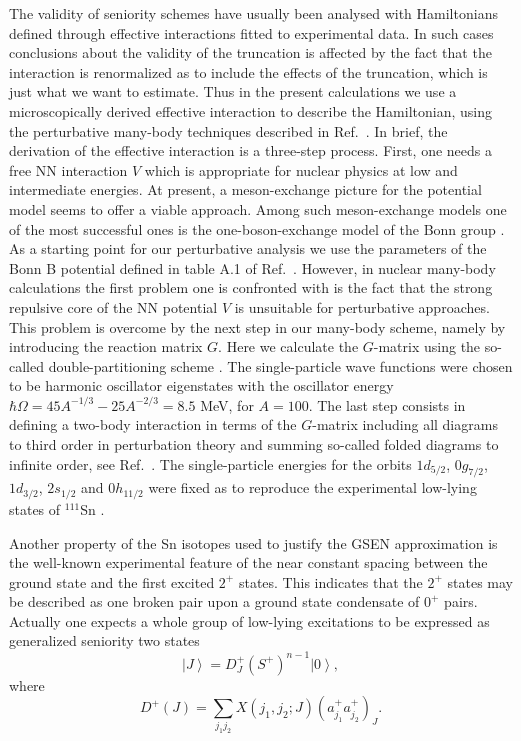 The validity of seniority schemes have usually been analysed
with  Hamiltonians defined through 
effective interactions fitted to  experimental data. 
In such cases conclusions about the validity of the truncation is 
affected by the fact that the interaction is renormalized as to include 
the effects of the truncation, which is just what we want to estimate.
Thus in the present calculations we use  a microscopically derived effective
interaction to describe the Hamiltonian, using the perturbative many-body
techniques described in Ref.\ \cite{oslo95b}.
In brief,
the derivation of the effective interaction is a three-step process.
First, one needs a free NN interaction $V$ which is
appropriate for nuclear physics at low and intermediate energies. At
present, a meson-exchange picture for the potential model seems to offer a
viable approach. Among such meson-exchange
models one of the most successful ones is the one-boson-exchange model of the
Bonn group \cite{mac89}. As a starting point for our perturbative analysis 
we use the parameters of the Bonn B potential defined in table A.1 of 
Ref.\ \cite{mac89}. However, 
in nuclear many-body calculations the first problem one is
confronted with is the fact that the strong 
repulsive core of the NN potential $V$
is unsuitable for perturbative approaches. This problem is overcome by 
the next
step in our many-body scheme, namely 
by introducing the reaction matrix $G$. Here we calculate the 
$G$-matrix  using the so-called 
double-partitioning 
scheme \cite{oslo95b}.
The single-particle wave functions were chosen to be harmonic oscillator 
eigenstates with the oscillator energy 
$\hbar\Omega = 45A^{-1/3} - 25A^{-2/3}=8.5 $ MeV,  for $A=100$.
The last step consists in defining a
two-body interaction in terms of the $G$-matrix including all diagrams
to third order in perturbation theory and summing so-called 
folded diagrams to infinite order, see Ref.\ \cite{oslo95b}.
The single-particle
energies for the orbits $1d_{5/2}$, $0g_{7/2}$, $1d_{3/2}$, $2s_{1/2}$
and  $0h_{11/2}$ were fixed as to reproduce the experimental low-lying
states of $^{111}$Sn  \cite{Stockholm95}.

Another property of the Sn isotopes used to justify the 
GSEN approximation is the well-known experimental feature of the 
near constant  spacing between the ground state and the 
first excited $2^+$ states. This  
indicates that the $2^+$ states  may be described as one
broken pair upon 
a  ground state condensate of $0^+$ pairs. 
Actually one expects a whole group of
low-lying excitations to be expressed as generalized seniority two
 states  \cite {Talmi71} 
\begin{equation}\label{eq:sen2}
    \left | J\right \rangle = D_{J}^+ (S^+)^{n-1}\left | 0 \right \rangle,
\end{equation}
where
\begin{equation}\label{eq;d}
   D^+(J)= \sum_{j_1j_2} X(j_1,j_2;J)(a_{j_1}^+a_{j_2}^+)_{J}.
\end{equation}

